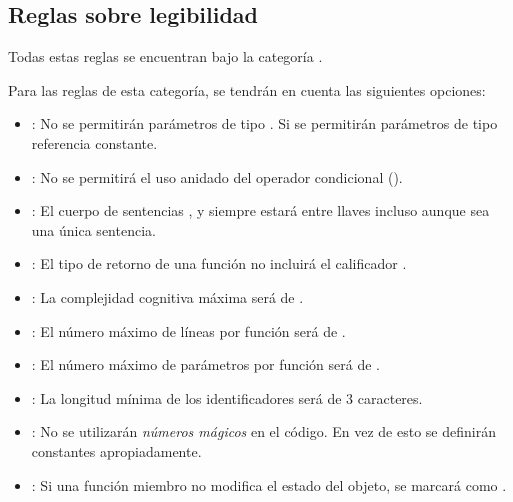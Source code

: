 \subsection{Reglas sobre legibilidad}

Todas estas reglas se encuentran bajo la categoría .

Para las reglas de esta categoría, se tendrán en cuenta las siguientes
opciones:

\begin{itemize}

\item {}:
No se permitirán parámetros de tipo .
Si se permitirán parámetros de tipo referencia constante.

\item {}:
No se permitirá el uso anidado del operador condicional ().

\item {}:
El cuerpo de sentencias ,  y 
siempre estará entre llaves incluso aunque sea una única sentencia.

\item {}:
El tipo de retorno de una función no incluirá el calificador .

\item {}:
La complejidad cognitiva máxima será de .

\item {}:
El número máximo de líneas por función será de .

\item {}:
El número máximo de parámetros por función será de .

\item {}:
La longitud mínima de los identificadores será de 3 caracteres.

\item {}:
No se utilizarán \emph{números mágicos} en el código.
En vez de esto se definirán constantes apropiadamente.

\item {}:
Si una función miembro no modifica el estado del objeto, se marcará como .

\end{itemize}
